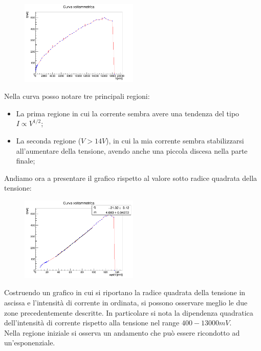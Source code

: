 \documentclass[10pt,twocolumn]{article}
\begin{document}
\begin{figure}[H] %
  \centering
  \includegraphics[width=0.5\textwidth]{curva_voltammetrica/curva_voltamperometrica.png} %
  \label{fig:I_V_}
\end{figure}
Nella curva posso notare tre principali regioni:
\begin{itemize}
    \item La prima regione in cui la corrente sembra avere una tendenza del tipo $I \propto V^{1/2}$;
    \item La seconda regione ($V > 14V$), in cui la mia corrente sembra stabilizzarsi all'aumentare della tensione, avendo anche una piccola discesa nella parte finale;
\end{itemize}
Andiamo ora a presentare il grafico rispetto al valore sotto radice quadrata della tensione:
\vspace{1.5cm}
\begin{figure}[H] %
  \centering
  \includegraphics[width=0.5\textwidth]{curva_voltammetrica/curva_voltammetrica_sqrt.png} %
  \label{fig:I_V_}
\end{figure}
\noindent Costruendo un grafico in cui si riportano la radice quadrata della tensione in ascissa e l'intensità di corrente in ordinata, si possono osservare meglio le due zone precedentemente descritte.
In particolare si nota la dipendenza quadratica dell'intensità di corrente rispetto alla tensione nel range $400-13000mV$.\\ 
Nella regione iniziale si osserva un andamento che può essere ricondotto ad un'esponenziale.
\end{document}
